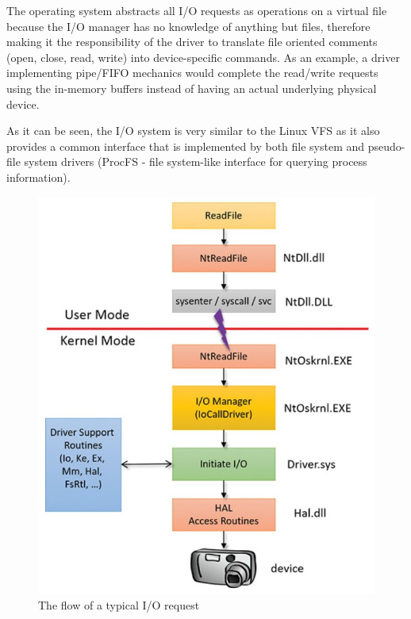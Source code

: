 		
		The operating system abstracts all I/O requests as operations on a virtual file because the I/O manager has no knowledge of anything but files, therefore making it the responsibility of the driver to translate file oriented comments (open, close, read, write) into device-specific commands\cite{WindowsInternals}. As an example, a driver implementing pipe/FIFO mechanics would complete the read/write requests using the in-memory buffers instead of having an actual underlying physical device. 
		
		As it can be seen, the I/O system is very similar to the Linux VFS as it also provides a common interface that is implemented by both file system and pseudo-file system drivers (ProcFS - file system-like interface for querying process information).\\
		
	
		\begin{figure}[h!]
			\begin{center}
				\includegraphics[scale=0.9]{images/IORequest.jpg}
				\caption{The flow of a typical I/O request\cite{WindowsInternals}}
				\label{fig:IORequest}
			\end{center}
		\end{figure}
		\pagebreak

